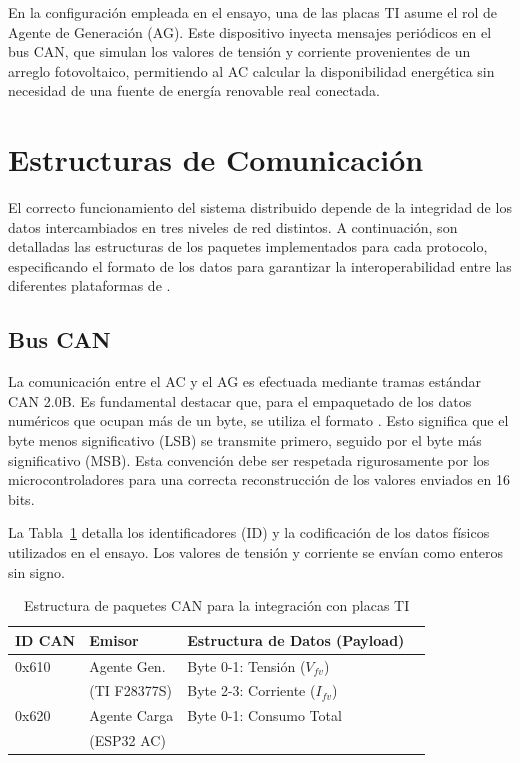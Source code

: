 En la configuración empleada en el ensayo, una de las placas TI asume el rol de Agente de Generación (AG). Este dispositivo inyecta mensajes periódicos en el bus CAN, que simulan los valores de tensión y corriente provenientes de un arreglo fotovoltaico, permitiendo al AC calcular la disponibilidad energética sin necesidad de una fuente de energía renovable real conectada.

\section{Estructuras de Comunicación}

El correcto funcionamiento del sistema distribuido depende de la integridad de los datos intercambiados en tres niveles de red distintos. A continuación, son detalladas las estructuras de los paquetes implementados para cada protocolo, especificando el formato de los datos para garantizar la interoperabilidad entre las diferentes plataformas de .

\subsection{Bus CAN}
La comunicación entre el AC y el AG es efectuada mediante tramas estándar CAN 2.0B. Es fundamental destacar que, para el empaquetado de los datos numéricos que ocupan más de un byte, se utiliza el formato . Esto significa que el byte menos significativo (LSB) se transmite primero, seguido por el byte más significativo (MSB). Esta convención debe ser respetada rigurosamente por los microcontroladores para una correcta reconstrucción de los valores enviados en 16 bits.

La Tabla~\ref{tab:paquetes_can} detalla los identificadores (ID) y la codificación de los datos físicos utilizados en el ensayo. Los valores de tensión y corriente se envían como enteros sin signo.

\begin{table}[ht!]
\centering
\caption{Estructura de paquetes CAN para la integración con placas TI}
\label{tab:paquetes_can}
\begin{tabular}{|l|l|l|l|}
\hline
\textbf{ID CAN} & \textbf{Emisor} & \textbf{Estructura de Datos (Payload)}\\ \hline
0x610 & Agente Gen. & Byte 0-1: Tensión ($V_{fv}$) \\
      & (TI F28377S) & Byte 2-3: Corriente ($I_{fv}$) \\ \hline
0x620 & Agente Carga & Byte 0-1: Consumo Total \\ 
      & (ESP32 AC) & \\ \hline
\end{tabular}
\end{table}

